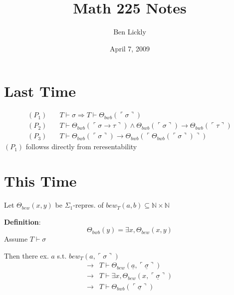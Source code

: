 \documentclass[12pt]{article}
\author{Ben Lickly}
\date{April 7, 2009}
\title{Math 225 Notes}
\newcommand{\Nat}{\ensuremath{\mathbb{N}}}
\newcommand{\proves}{\vdash}
\newcommand{\gn}[1]{\ulcorner #1 \urcorner}
\newcommand{\defn}{\textbf{Definition}: }
\begin{document}
\maketitle

\section*{Last Time}
\begin{align*}
  (P_1)& \quad 
  T \proves \sigma \Rightarrow T \proves \Theta_{bwb}(\gn{\sigma}) \\
  (P_2)& \quad
  T \proves \Theta_{bwb}(\gn{\sigma \rightarrow \tau}) \wedge
        \Theta_{bwb}(\gn{\sigma}) \rightarrow \Theta_{bwb}(\gn{\tau}) \\
  (P_3)& \quad
  T \proves \Theta_{bwb}(\gn{\sigma}) \rightarrow 
        \Theta_{bwb}(\gn{\Theta_{bwb}(\gn{\sigma})})
\end{align*}
$(P_1)$ followss directly from reresentability

\section*{This Time}
Let $\Theta_{bew}(x,y)$ be $\Sigma_1$-repres. of $bew_T(a,b) \subseteq \Nat \times \Nat$

\defn \[
\Theta_{bwb}(y) = \exists x, \Theta_{bew}(x,y)
\]
Assume $T \proves \sigma$

Then there ex. $a$ s.t. $bew_T(a, \gn{\sigma})$
\begin{align*}
 \rightarrow& T \proves \Theta_{bew}(\underline{a}, \underline{\gn{\sigma}}) \\
 \rightarrow& T \proves \exists x, \Theta_{bew}(x, \underline{\gn{\sigma}}) \\
 \rightarrow& T \proves  \Theta_{bwb}(\underline{\gn{\sigma}})
\end{align*}
\end{document}
